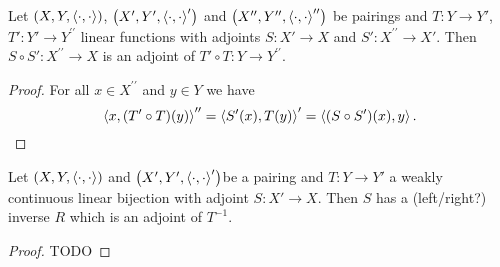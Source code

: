 \begin{proposition}
Let $\sSet{X,Y,\pair{\cdot,\cdot}}$, $\sSet{X',Y',\pair{\cdot,\cdot}'}$ and $\sSet{X^{\prime\prime},Y^{\prime\prime},\pair{\cdot,\cdot}^{\prime\prime}}$ be pairings and $T: Y\to Y'$, $T': Y'\to Y^{\prime\prime}$ linear functions with adjoints $S: X'\to X$ and $S': X^{\prime\prime}\to X'$. Then $S\circ S': X^{\prime\prime}\to X$ is an adjoint of $T'\circ T: Y\to Y^{\prime\prime}$.
\end{proposition}
\begin{proof}
For all $x\in X^{\prime\prime}$ and $y\in Y$ we have
\[ \left\langle x, (T'\circ T)(y) \right\rangle^{\prime\prime} = \left\langle S'(x), T(y) \right\rangle' = \left\langle (S\circ S')(x), y \right\rangle. \]
\end{proof}
\begin{corollary}
Let $\sSet{X,Y,\pair{\cdot,\cdot}}$ and $\sSet{X',Y',\pair{\cdot,\cdot}'}$be a pairing and $T: Y\to Y'$ a weakly continuous linear bijection with adjoint $S: X'\to X$. Then $S$ has a (left/right?) inverse $R$ which is an adjoint of $T^{-1}$.
\end{corollary}
\begin{proof}
TODO
\end{proof}

